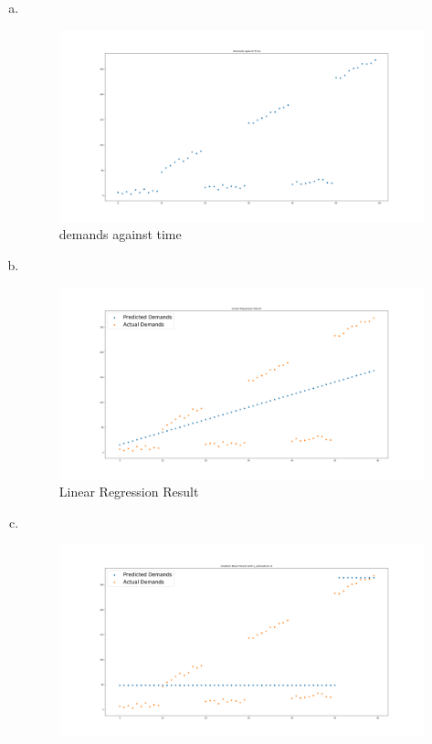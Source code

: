 \documentclass[a4paper]{article}
\begin{document}
    \begin{enumerate}[(a)]
        \item   \quad\\
            \begin{figure}[H]
                \centering
                \includegraphics[scale=0.25]{P1a.png}
                \caption{demands against time}
            \end{figure}
        \item   \quad\\
        \begin{figure}[H]
            \centering
            \includegraphics[scale=0.25]{P1b.png}
            \caption{Linear Regression Result}
        \end{figure}
        \item   \quad\\
        \begin{figure}[H]
            \centering
            \includegraphics[scale=0.25]{P1c1.png}

\end{figure}
\end{enumerate}
\end{document}
